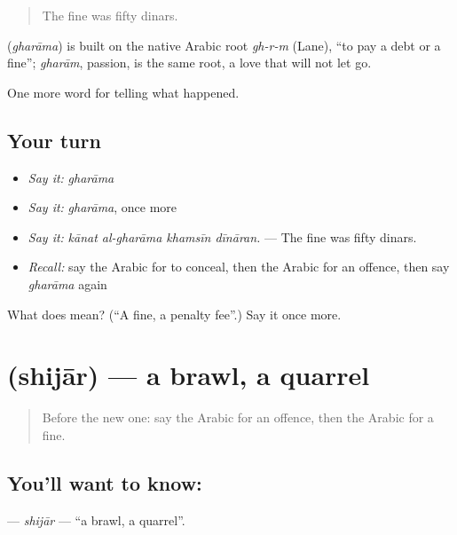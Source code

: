 \begin{quote}
The fine was fifty dinars.
\end{quote}

\begin{cousinweb}
\textbf{} (\emph{gharāma}) is built on the native Arabic root \emph{gh-r-m} (Lane), \textquotedblleft{}to pay a debt or a fine\textquotedblright{}; \emph{gharām}, passion, is the same root, a love that will not let go.
\end{cousinweb}

\begin{grammarlens}[title={What you've built}]
One more word for telling what happened.
\end{grammarlens}

\subsection*{Your turn}
\begin{itemize}
\raggedright
  \item \emph{Say it:} \emph{gharāma}
  \item \emph{Say it:} \emph{gharāma}, once more
  \item \emph{Say it:} \emph{kānat al-gharāma khamsīn dīnāran.} — The fine was fifty dinars.
  \item \emph{Recall:} say the Arabic for to conceal, then the Arabic for an offence, then say \emph{gharāma} again
\end{itemize}

\begin{tcolorbox}[breakable,colback=teal!4,colframe=teal!35!black,title={Before you move on}]
What does  mean? (\textquotedblleft{}A fine, a penalty fee\textquotedblright{}.) Say it once more.
\end{tcolorbox}
\section[\texorpdfstring{\ar{شجار} (shijār)}{شجار (shijār)}]{ (shijār) — a brawl, a quarrel}

\label{lesson:AR-C352-shijar}



\begin{quote}
Before the new one: say the Arabic for an offence, then the Arabic for a fine.
\end{quote}

\subsection*{You'll want to know: }
\textbf{} — \emph{shijār} — \textquotedblleft{}a brawl, a quarrel\textquotedblright{}.

